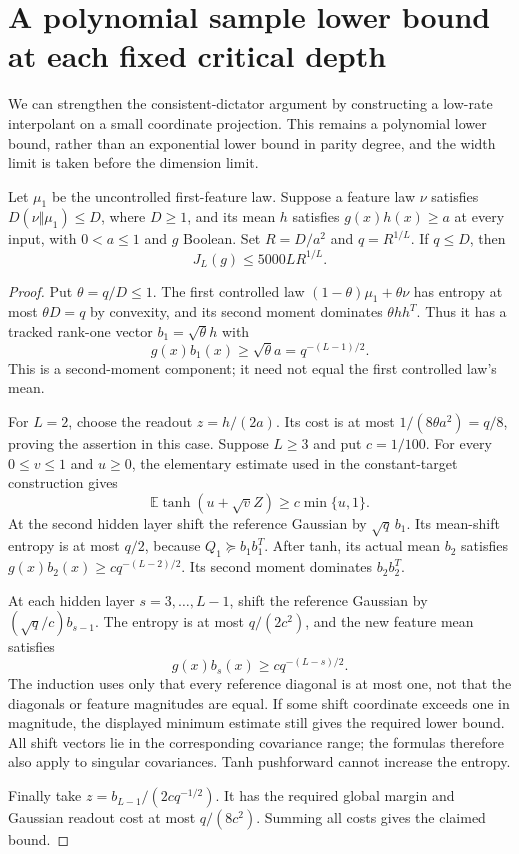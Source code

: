 \section{A polynomial sample lower bound at each fixed critical depth}
\label{sec:critical-polynomial-sample-lower}

We can strengthen the consistent-dictator argument by constructing a
low-rate interpolant on a small coordinate projection. This remains a
polynomial lower bound, rather than an exponential lower bound in parity
degree, and the width limit is taken before the dimension limit.

\begin{lemma}
\label{lem:critical-mixture-mean-seed}
Let $\mu_1$ be the uncontrolled first-feature law. Suppose a feature law
$\nu$ satisfies $D(\nu\Vert\mu_1)\le D$, where $D\ge1$, and its mean
$h$ satisfies $g(x)h(x)\ge a$ at every input, with $0<a\le1$ and
$g$ Boolean. Set $R=D/a^2$ and $q=R^{1/L}$. If $q\le D$, then
\[
 J_L(g)\le5000L R^{1/L}.
\]
\end{lemma}

\begin{proof}
Put $\theta=q/D\le1$. The first controlled law
$(1-\theta)\mu_1+\theta\nu$ has entropy at most $\theta D=q$ by
convexity, and its second moment dominates
$\theta hh^T$. Thus it has a tracked rank-one vector
$b_1=\sqrt\theta h$ with
\[
 g(x)b_1(x)\ge\sqrt\theta a=q^{-(L-1)/2}.
\]
This is a second-moment component; it need not equal the first
controlled law's mean.

For $L=2$, choose the readout $z=h/(2a)$. Its cost is at most
$1/(8\theta a^2)=q/8$, proving the assertion in this case.
Suppose $L\ge3$ and put $c=1/100$. For every $0\le v\le1$ and
$u\ge0$, the elementary estimate used in the constant-target
construction gives
\[
 \mathbb E\tanh(u+\sqrt v Z)\ge c\min\{u,1\}.
\]
At the second hidden layer shift the reference Gaussian by
$\sqrt q\,b_1$. Its mean-shift entropy is at most $q/2$, because
$Q_1\succeq b_1b_1^T$. After tanh, its actual mean $b_2$ satisfies
$g(x)b_2(x)\ge c q^{-(L-2)/2}$. Its second moment dominates
$b_2b_2^T$.

At each hidden layer $s=3,\ldots,L-1$, shift the reference Gaussian
by $(\sqrt q/c)b_{s-1}$. The entropy is at most $q/(2c^2)$, and
the new feature mean satisfies
\[
 g(x)b_s(x)\ge c q^{-(L-s)/2}.
\]
The induction uses only that every reference diagonal is at most one,
not that the diagonals or feature magnitudes are equal. If some shift
coordinate exceeds one in magnitude, the displayed minimum estimate
still gives the required lower bound. All shift vectors lie in the
corresponding covariance range; the formulas therefore also apply to
singular covariances. Tanh pushforward cannot increase the entropy.

Finally take $z=b_{L-1}/(2c q^{-1/2})$. It has the required global
margin and Gaussian readout cost at most $q/(8c^2)$. Summing all
costs gives the claimed bound.
\end{proof}

